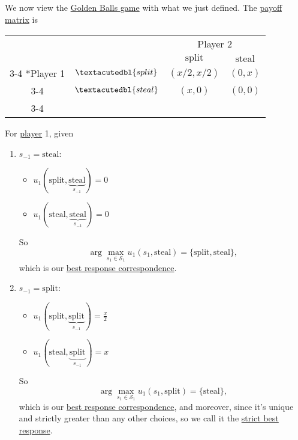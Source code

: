 \begin{prev}
	We now view the \hyperref[eg:golden-ball]{Golden Balls game} with what we just defined. The \hyperref[def:payoff-matrix]{payoff matrix} is
	\begin{table}[H]
		\centering
		\setlength{\extrarowheight}{2pt}
		\begin{tabular}{cc|c|c|}
			                        & \multicolumn{1}{c}{}   & \multicolumn{2}{c}{Player 2}                                            \\
			                        & \multicolumn{1}{c}{}   & \multicolumn{1}{c}{$\text{split}$} & \multicolumn{1}{c}{$\text{steal}$} \\\cline{3-4}
			\multirow{2}*{Player 1} & $\textacutedbl{split}$ & $(x/2, x/2)$                       & $(0, x)$                           \\\cline{3-4}
			                        & $\textacutedbl{steal}$ & $(x, 0)$                           & $(0, 0)$                           \\\cline{3-4}
		\end{tabular}
	\end{table}

	For \hyperref[def:player]{player} 1, given
	\begin{enumerate}
		\item \(s_{-1} = \text{steal}\):
		      \begin{itemize}
			      \item \(u_1(\text{split} , \underbrace{\text{steal}}_{s_{-1}} ) = 0\)
			      \item \(u_1(\text{steal} , \underbrace{\text{steal}}_{s_{-1}} ) = 0\)
		      \end{itemize}
		      So
		      \[
			      \arg\max_{s_1\in \mathcal{S}_1} u_1(s_1, \text{steal} ) = \{\text{split}, \text{steal}  \},
		      \]
		      which is our \hyperref[def:best-response]{best response correspondence}.
		\item \(s_{-1} = \mathrm{split}\):
		      \begin{itemize}
			      \item \(u_1(\text{split} , \underbrace{\text{split}}_{s_{-1}} ) = \frac{x}{2}\)
			      \item \(u_1(\text{steal} , \underbrace{\text{split}}_{s_{-1}} ) = x\)
		      \end{itemize}
		      So
		      \[
			      \arg\max_{s_1\in \mathcal{S}_1} u_1(s_1, \text{split} ) = \{\text{steal}\},
		      \]
		      which is our \hyperref[def:best-response]{best response correspondence}, and moreover, since it's unique and strictly greater
		      than any other choices, so we call it the \hyperref[def:strict-best-response]{strict best response}.
	\end{enumerate}
\end{prev}

